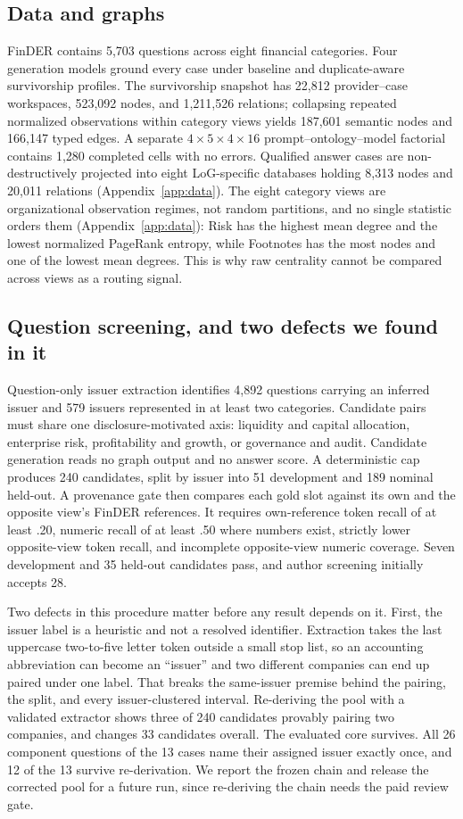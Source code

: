 \documentclass{article}
\begin{document}
\subsection{Data and graphs}
FinDER contains 5,703 questions across eight financial categories. Four generation models ground every case under baseline and duplicate-aware survivorship profiles. The survivorship snapshot has 22,812 provider--case workspaces, 523,092 nodes, and 1,211,526 relations; collapsing repeated normalized observations within category views yields 187,601 semantic nodes and 166,147 typed edges. A separate $4\times5\times4\times16$ prompt--ontology--model factorial contains 1,280 completed cells with no errors. Qualified answer cases are non-destructively projected into eight LoG-specific databases holding 8,313 nodes and 20,011 relations (Appendix~\ref{app:data}). The eight category views are organizational observation regimes, not random partitions, and no single statistic orders them (Appendix~\ref{app:data}): Risk has the highest mean degree and the lowest normalized PageRank entropy, while Footnotes has the most nodes and one of the lowest mean degrees. This is why raw centrality cannot be compared across views as a routing signal.


\subsection{Question screening, and two defects we found in it}
Question-only issuer extraction identifies 4,892 questions carrying an inferred issuer and 579 issuers represented in at least two categories. Candidate pairs must share one disclosure-motivated axis: liquidity and capital allocation, enterprise risk, profitability and growth, or governance and audit. Candidate generation reads no graph output and no answer score. A deterministic cap produces 240 candidates, split by issuer into 51 development and 189 nominal held-out. A provenance gate then compares each gold slot against its own and the opposite view's FinDER references. It requires own-reference token recall of at least .20, numeric recall of at least .50 where numbers exist, strictly lower opposite-view token recall, and incomplete opposite-view numeric coverage. Seven development and 35 held-out candidates pass, and author screening initially accepts 28.

Two defects in this procedure matter before any result depends on it. First, the issuer label is a heuristic and not a resolved identifier. Extraction takes the last uppercase two-to-five letter token outside a small stop list, so an accounting abbreviation can become an ``issuer'' and two different companies can end up paired under one label. That breaks the same-issuer premise behind the pairing, the split, and every issuer-clustered interval. Re-deriving the pool with a validated extractor shows three of 240 candidates provably pairing two companies, and changes 33 candidates overall. The evaluated core survives. All 26 component questions of the 13 cases name their assigned issuer exactly once, and 12 of the 13 survive re-derivation. We report the frozen chain and release the corrected pool for a future run, since re-deriving the chain needs the paid review gate.
\end{document}
